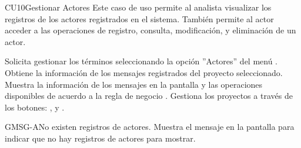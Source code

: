 	\begin{UseCase}{CU10}{Gestionar Actores}{
	Este caso de uso permite al analista visualizar los registros de los actores registrados en el sistema. También permite al actor acceder a las operaciones de registro, consulta, modificación, y eliminación de un actor.
	}
	
\end{UseCase}
\begin{UCtrayectoria}
	\UCpaso[\UCactor] Solicita gestionar los términos seleccionando la opción ''Actores'' del menú .
	\UCpaso[\UCsist] Obtiene la información de los mensajes registrados del proyecto seleccionado. 
	\UCpaso[\UCsist] Muestra la información de los mensajes en la pantalla  y las operaciones disponibles de acuerdo a la regla de negocio .
	\UCpaso[\UCactor] Gestiona los proyectos a través de los botones: , \editar y \eliminar. \label{CU10-P4}
\end{UCtrayectoria}		
\begin{UCtrayectoriaA}{GMSG-A}{No existen registros de actores.}
	\UCpaso[\UCsist] Muestra el mensaje  en la pantalla  para indicar que no hay registros de actores para mostrar.
\end{UCtrayectoriaA}

